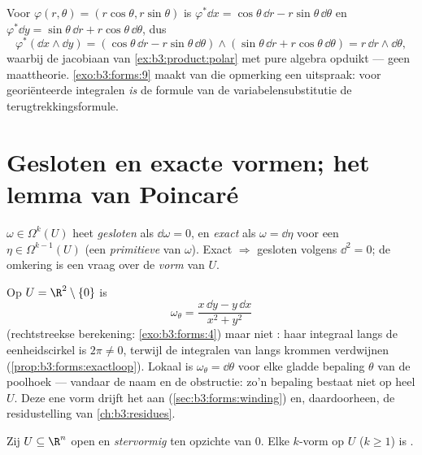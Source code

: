 \begin{example}[Poolcoördinaten]\label{ex:b3:forms:polar}
Voor $\varphi(r, \theta) = (r\cos\theta, r\sin\theta)$ is
$\varphi^*\dd x = \cos\theta\,\dd r - r\sin\theta\,\dd\theta$ en
$\varphi^*\dd y = \sin\theta\,\dd r + r\cos\theta\,\dd\theta$,
dus
\[
\varphi^*(\dd x \wedge \dd y) =
(\cos\theta\,\dd r - r\sin\theta\,\dd\theta) \wedge
(\sin\theta\,\dd r + r\cos\theta\,\dd\theta)
= r\,\dd r \wedge \dd\theta,
\]
waarbij de jacobiaan van \cref{ex:b3:product:polar} met pure
algebra opduikt --- geen maattheorie. \cref{exo:b3:forms:9}
maakt van die opmerking een uitspraak: voor georiënteerde
integralen \emph{is} de formule van de variabelensubstitutie de
terugtrekkingsformule.
\end{example}

\section{Gesloten en exacte vormen; het lemma van Poincaré}

\begin{definition}\label{def:b3:forms:closedexact}
$\omega \in \Omega^k(U)$ heet \emph{gesloten} als $\dd\omega = 0$, en \emph{exact} als
$\omega = \dd\eta$ voor een $\eta \in \Omega^{k-1}(U)$ (een
\emph{primitieve} van $\omega$). Exact $\Rightarrow$ gesloten
volgens $\dd^2 = 0$; de omkering is een vraag over de
\emph{vorm} van $U$.
\end{definition}

\begin{example}[De hoekvorm]\label{ex:b3:forms:angular}
Op $U = \R^2 \setminus \{0\}$ is
\[
\omega_\theta = \frac{x\,\dd y - y\,\dd x}{x^2 + y^2}
\]
 (rechtstreekse berekening: \cref{exo:b3:forms:4}) maar
niet : haar integraal langs de eenheidscirkel is $2\pi \neq
0$, terwijl de integralen van  langs 
krommen verdwijnen (\cref{prop:b3:forms:exactloop}). Lokaal is
$\omega_\theta = \dd\theta$ voor elke gladde bepaling $\theta$
van de poolhoek --- vandaar de naam en de obstructie: zo'n
bepaling bestaat niet op heel $U$. Deze ene vorm drijft het
 aan (\cref{sec:b3:forms:winding}) en, daardoorheen,
de residustelling van \cref{ch:b3:residues}.
\end{example}

\begin{theorem}\label{thm:b3:forms:poincare}
Zij $U \subseteq \R^n$ open en \emph{stervormig} ten opzichte van
$0$. Elke  $k$-vorm op $U$ ($k \geq 1$) is
.
\end{theorem}

